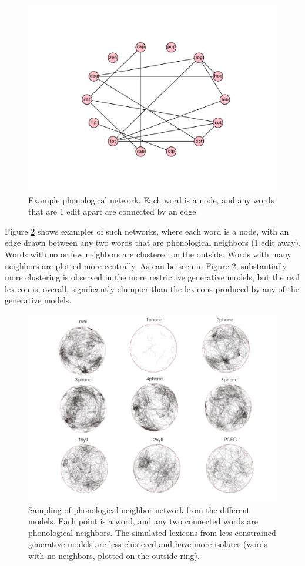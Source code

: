 \documentclass{article}
\begin{document}
\begin{figure}[htbp] \centering
 \includegraphics[width=.9\textwidth]{PDFs/toy.pdf}
  \caption{Example phonological network. Each word is a node, and any words that are 1 edit apart are
connected by an edge.}
  \label{fig:toy}
\end{figure}


Figure \ref{fig:networks} shows examples of such networks, where each word is a node, with an edge drawn
between any two words that are phonological neighbors (1 edit away). Words with no or few neighbors are
clustered on the outside. Words with many neighbors are plotted more centrally. As can be seen in Figure
\ref{fig:networks}, substantially more clustering is observed in the more restrictive generative models, but
the real lexicon is, overall, significantly clumpier than the lexicons produced by any of the generative
models.

\begin{figure} \centering
  \includegraphics[width=1\textwidth]{networks/net.jpg}
  \caption{Sampling of phonological neighbor network from the different models. Each point is a word, and any
two connected words are phonological neighbors. The simulated lexicons from less constrained generative models
are less clustered and have more isolates (words with no neighbors, plotted on the outside ring).}
  \label{fig:networks}
\end{figure}
\end{document}
